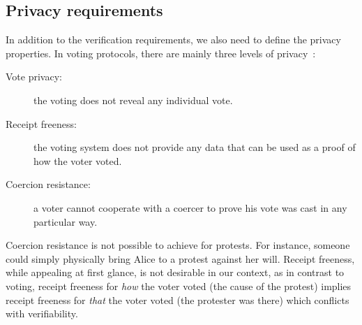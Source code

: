 \subsection{Privacy requirements}%
\label{privacy-properties}

In addition to the verification requirements, we also need to define the privacy properties.
In voting protocols, there are mainly three levels of privacy~\cite{VerifyingPrivacyPropertiesOfVotingProtocols}:
\begin{description}
  \item[Vote privacy:] the voting does not reveal any individual vote.
  \item[Receipt freeness:] the voting system does not provide any data that can 
    be used as a proof of how the voter voted.
  \item[Coercion resistance:] a voter cannot cooperate with a coercer to prove 
    his vote was cast in any particular way.
\end{description}

Coercion resistance is not possible to achieve for protests.
For instance, someone could simply physically bring Alice to a protest against her will.
Receipt freeness, while appealing at first glance, is not desirable in our context, as in contrast to voting, receipt freeness for \emph{how} the voter voted (\ie the cause of the protest) implies receipt freeness for \emph{that} the voter voted (\ie the protester was there) which conflicts with verifiability.



